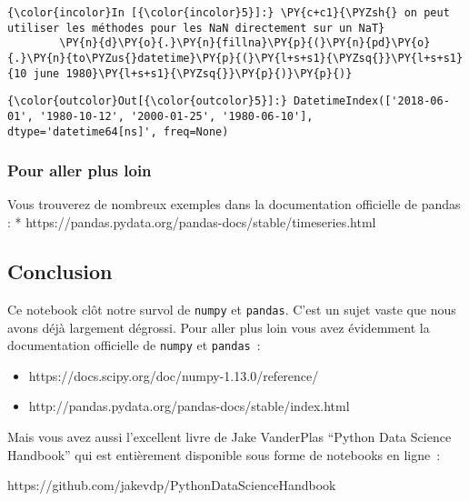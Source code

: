     \begin{Verbatim}[commandchars=\\\{\}]
{\color{incolor}In [{\color{incolor}5}]:} \PY{c+c1}{\PYZsh{} on peut utiliser les méthodes pour les NaN directement sur un NaT}
        \PY{n}{d}\PY{o}{.}\PY{n}{fillna}\PY{p}{(}\PY{n}{pd}\PY{o}{.}\PY{n}{to\PYZus{}datetime}\PY{p}{(}\PY{l+s+s1}{\PYZsq{}}\PY{l+s+s1}{10 june 1980}\PY{l+s+s1}{\PYZsq{}}\PY{p}{)}\PY{p}{)}
\end{Verbatim}


\begin{Verbatim}[commandchars=\\\{\}]
{\color{outcolor}Out[{\color{outcolor}5}]:} DatetimeIndex(['2018-06-01', '1980-10-12', '2000-01-25', '1980-06-10'], dtype='datetime64[ns]', freq=None)
\end{Verbatim}
            
    \hypertarget{pour-aller-plus-loin}{%
\subsubsection{Pour aller plus loin}\label{pour-aller-plus-loin}}

    Vous trouverez de nombreux exemples dans la documentation officielle de
pandas : * https://pandas.pydata.org/pandas-docs/stable/timeseries.html

    \hypertarget{conclusion}{%
\subsection{Conclusion}\label{conclusion}}

    Ce notebook clôt notre survol de \texttt{numpy} et \texttt{pandas}.
C'est un sujet vaste que nous avons déjà largement dégrossi. Pour aller
plus loin vous avez évidemment la documentation officielle de
\texttt{numpy} et \texttt{pandas}~:

\begin{itemize}
\tightlist
\item
  https://docs.scipy.org/doc/numpy-1.13.0/reference/
\item
  http://pandas.pydata.org/pandas-docs/stable/index.html
\end{itemize}

    Mais vous avez aussi l'excellent livre de Jake VanderPlas ``Python Data
Science Handbook'' qui est entièrement disponible sous forme de
notebooks en ligne~:

https://github.com/jakevdp/PythonDataScienceHandbook

